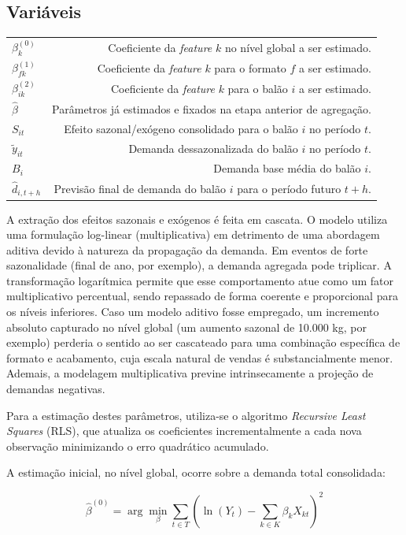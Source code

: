 \documentclass[fleqn,12pt,a4paper]{article}
\begin{document}
\subsection*{Variáveis}
\begin{tabularx}{\linewidth}{@{}L{2.8cm}R@{}}
$\beta^{(0)}_{k}$ & Coeficiente da \textit{feature} $k$ no nível global a ser estimado.\\
$\beta^{(1)}_{fk}$ & Coeficiente da \textit{feature} $k$ para o formato $f$ a ser estimado.\\
$\beta^{(2)}_{ik}$ & Coeficiente da \textit{feature} $k$ para o balão $i$ a ser estimado.\\
$\hat{\beta}$ & Parâmetros já estimados e fixados na etapa anterior de agregação.\\
$S_{it}$ & Efeito sazonal/exógeno consolidado para o balão $i$ no período $t$.\\
$\tilde{y}_{it}$ & Demanda dessazonalizada do balão $i$ no período $t$.\\
$B_{i}$ & Demanda base média do balão $i$.\\
$\hat{d}_{i,t+h}$ & Previsão final de demanda do balão $i$ para o período futuro $t+h$.\\
\end{tabularx}

\vspace{1cm}

A extração dos efeitos sazonais e exógenos é feita em cascata. O modelo utiliza uma formulação log-linear (multiplicativa) em detrimento de uma abordagem aditiva devido à natureza da propagação da demanda. Em eventos de forte sazonalidade (final de ano, por exemplo), a demanda agregada pode triplicar. A transformação logarítmica permite que esse comportamento atue como um fator multiplicativo percentual, sendo repassado de forma coerente e proporcional para os níveis inferiores. Caso um modelo aditivo fosse empregado, um incremento absoluto capturado no nível global (um aumento sazonal de 10.000 kg, por exemplo) perderia o sentido ao ser cascateado para uma combinação específica de formato e acabamento, cuja escala natural de vendas é substancialmente menor. Ademais, a modelagem multiplicativa previne intrinsecamente a projeção de demandas negativas.

Para a estimação destes parâmetros, utiliza-se o algoritmo \textit{Recursive Least Squares} (RLS), que atualiza os coeficientes incrementalmente a cada nova observação minimizando o erro quadrático acumulado.

A estimação inicial, no nível global, ocorre sobre a demanda total consolidada:
\begin{ceqn}
\begin{equation}
\hat{\beta}^{(0)} = \arg\min_{\beta} \sum_{t \in T} \left( \ln(Y_t) - \sum_{k \in K} \beta_{k} X_{kt} \right)^2
\label{eq:demanda_nivel0}
\end{equation}
\end{ceqn}
\end{document}
